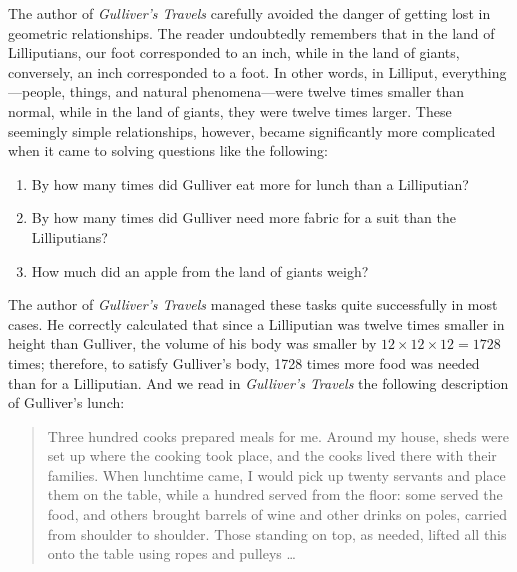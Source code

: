 The author of \emph{Gulliver's Travels} carefully avoided the danger of getting lost in geometric relationships. The reader undoubtedly remembers that in the land of Lilliputians, our foot corresponded to an inch, while in the land of giants, conversely, an inch corresponded to a foot. In other words, in Lilliput, everything—people, things, and natural phenomena—were twelve times smaller than normal, while in the land of giants, they were twelve times larger. These seemingly simple relationships, however, became significantly more complicated when it came to solving questions like the following:
\begin{enumerate}
\item By how many times did Gulliver eat more for lunch than a Lilliputian?
\item By how many times did Gulliver need more fabric for a suit than the Lilliputians?
\item How much did an apple from the land of giants weigh?
\end{enumerate}
The author of \emph{Gulliver's Travels} managed these tasks quite successfully in most cases. He correctly calculated that since a Lilliputian was twelve times smaller in height than Gulliver, the volume of his body was smaller by $12 \times 12 \times 12 = 1728$ times; therefore, to satisfy Gulliver's body, 1728 times more food was needed than for a Lilliputian. And we read in \emph{Gulliver's Travels} the following description of Gulliver's lunch:
\begin{quote}
Three hundred cooks prepared meals for me. Around my house, sheds were set up where the cooking took place, and the cooks lived there with their families. When lunchtime came, I would pick up twenty servants and place them on the table, while a hundred served from the floor: some served the food, and others brought barrels of wine and other drinks on poles, carried from shoulder to shoulder. Those standing on top, as needed, lifted all this onto the table using ropes and pulleys \dots{}
\end{quote}


